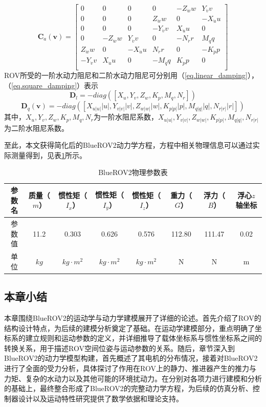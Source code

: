 \begin{equation}
    \symbf{C}_a(\symbf{v})=
\begin{bmatrix}
    0 & 0 & 0 & 0 & -Z_{\dot{w}}w & Y_{\dot{v}}v \\
    0 & 0 & 0 & Z_{\dot{w}}w & 0 & -X_{\dot{u}}u \\
    0 & 0 & 0 & -Y_{\dot{v}}v & X_{\dot{u}}u & 0 \\
    0 & -Z_{\dot{w}}w & Y_{\dot{v}}v & 0 & -N_{\dot{r}}r & M_{\dot{q}}q \\
    Z_{\dot{w}}w & 0 & -X_{\dot{u}}u & N_{\dot{r}}r & 0 & -K_{\dot{p}}p \\
    -Y_{\dot{v}}v & X_{\dot{u}}u & 0 & -M_{\dot{q}}q & K_{\dot{p}}p & 0 \\
\end{bmatrix}
\end{equation}
ROV所受的一阶水动力阻尼和二阶水动力阻尼可分别用（\ref{eq.linear_damping}），（\ref{eq.square_damping}）表示
\begin{equation}
    \symbf{D}_l=-diag([X_u,Y_v,Z_w,K_p,M_q,N_r])
    \label{eq.linear_damping}
\end{equation}
\begin{equation}
    \symbf{D}_{q}(\symbf{v}) = -diag([X_{u|u|}|u|,Y_{v|v|}|v|,Z_{w|w|}|w|,K_{p|p|}|p|,M_{q|q|}|q|,N_{r|r|}|r|])
    \label{eq.square_damping}
\end{equation}
其中，$X_u,Y_v,Z_w,K_p,M_q,N_r$为一阶水阻尼系数，$X_{u|u|},Y_{v|v|},Z_{w|w|},K_{p|p|},M_{q|q|},N_{r|r|}$为二阶水阻尼系数。

至此，本文获得简化后的BlueROV2动力学方程，方程中相关物理信息可以通过实际测量得到，见表\ref{t.physical_params}所示。

\begin{table}[htb]
  \centering
  \caption{BlueROV2物理参数表}
  \label{t.physical_params}
  \begin{tabular}{c c c c c c c c}
  \hline
参数名 & 质量（$m$） & 惯性矩（$I_x$）& 惯性矩（$I_y$） & 惯性矩（$I_z$） & 重力（$G$） & 浮力（$B$） & 浮心$z$轴坐标  \\
\hline
参数值 & 11.2 & 0.303 & 0.626 & 0.576 & 112.80 & 111.47 & 0.02 \\
单位 & $kg$ & $kg\cdot m^2$ & $kg\cdot m^2$ & $kg\cdot m^2$ &  N & N & m \\
\hline
\end{tabular}
\end{table}

\subsection{本章小结}

本章围绕BlueROV2的运动学与动力学建模展开了详细的论述。首先介绍了ROV的结构设计特点，为后续的建模分析奠定了基础。在运动学建模部分，重点明确了坐标系的建立规则和运动参数的定义，并详细推导了载体坐标系与惯性坐标系之间的转换关系，用于描述ROV空间位姿与运动参数的关系。随后，章节深入到BlueROV2的动力学模型构建，首先概述了其电机的分布情况，接着对BlueROV2进行了全面的受力分析，具体探讨了作用在ROV上的静力、推进器产生的推力与力矩、复杂的水动力以及其他可能的环境扰动力。在分别对各项力进行建模和分析的基础上，最终整合形成了BlueROV2的完整动力学方程，为后续的仿真分析、控制器设计以及运动特性研究提供了数学依据和理论支持。

\newpage

